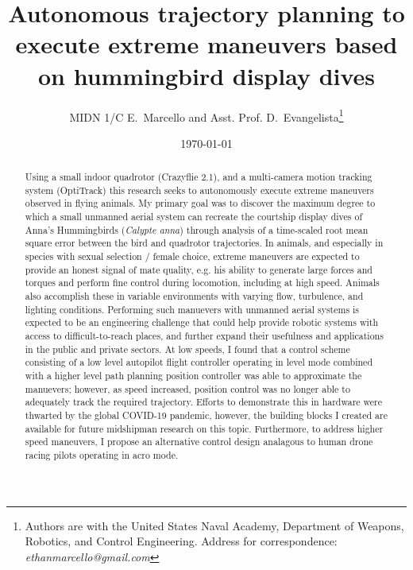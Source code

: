 \documentclass[onecolumn,10pt]{IEEEtran}
\title{Autonomous trajectory planning to execute extreme maneuvers based on hummingbird display dives}
\author{MIDN 1/C E.~Marcello and Asst. Prof. D.~Evangelista\thanks{Authors are with the United States Naval Academy, Department of Weapons, Robotics, and Control Engineering. Address for correspondence: \emph{ethanmarcello@gmail.com}}}
\date{\today}
\begin{document}
\maketitlepage
\maketitle

\begin{abstract}
Using a small indoor quadrotor (Crazyflie 2.1), and a multi-camera motion tracking system (OptiTrack) this research seeks to autonomously execute extreme maneuvers observed in flying animals.  My primary goal was to discover the maximum degree to which a small unmanned aerial system can recreate the courtship display dives of Anna's Hummingbirds (\emph{Calypte anna}) through analysis of a time-scaled root mean square error between the bird and quadrotor trajectories. In animals, and especially in species with sexual selection / female choice, extreme maneuvers are expected to provide an honest signal of mate quality, e.g. his ability to generate large forces and torques and perform fine control during locomotion, including at high speed. Animals also accomplish these in variable environments with varying flow, turbulence, and lighting conditions. Performing such manuevers with unmanned aerial systems is expected to be an engineering challenge that could help provide robotic systems with access to difficult-to-reach places, and further expand their usefulness and applications in the public and private sectors. At low speeds, I found that a control scheme consisting of a low level autopilot flight controller operating in level mode combined with a higher level path planning position controller was able to approximate the manuevers; however, as speed increased, position control was no longer able to adequately track the required trajectory. Efforts to demonstrate this in hardware were thwarted by the global COVID-19 pandemic, however, the building blocks I created are available for future midshipman research on this topic. Furthermore, to address higher speed maneuvers, I propose an alternative control design analagous to human drone racing pilots operating in acro mode.



\end{abstract}
\end{document}

